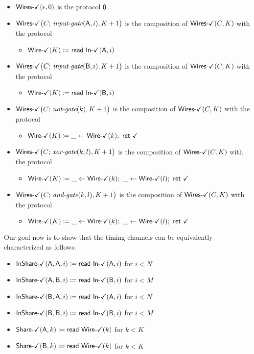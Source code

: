 \begin{itemize}
\item $\WiresOk(\epsilon,0)$ is the protocol $\zero$
\item $\WiresOk\big(C; \, \inputgate(\A,i),K+1\big)$ is the composition of $\WiresOk(C,K)$ with the protocol
\begin{itemize}
\item {\color{teal} $\WireOk(K) \coloneqq \read{\InOk(\A,i)}$}
\end{itemize}
\item $\WiresOk\big(C; \, \inputgate(\B,i),K+1\big)$ is the composition of $\WiresOk(C,K)$ with the protocol
\begin{itemize}
\item {\color{teal} $\WireOk(K) \coloneqq \read{\InOk(\B,i)}$}
\end{itemize}
\item $\WiresOk\big(C; \, \notgate(k),K+1\big)$ is the composition of $\WiresOk(C,K)$ with the protocol
\begin{itemize}
\item {\color{teal} $\WireOk(K) \coloneqq \_ \leftarrow \WireOk(k); \ \ret{\checkmark}$}
\end{itemize}
\item $\WiresOk\big(C; \, \xorgate(k,l),K+1\big)$ is the composition of $\WiresOk(C,K)$ with the protocol
\begin{itemize}
\item {\color{teal} $\WireOk(K) \coloneqq \_ \leftarrow \WireOk(k); \ \_ \leftarrow \WireOk(l); \ \ret{\checkmark}$}
\end{itemize}
\item $\WiresOk\big(C; \, \andgate(k,l),K+1\big)$ is the composition of $\WiresOk(C,K)$ with the protocol
\begin{itemize}
\item {\color{teal} $\WireOk(K) \coloneqq \_ \leftarrow \WireOk(k); \ \_ \leftarrow \WireOk(l); \ \ret{\checkmark}$}
\end{itemize}
\end{itemize}

\noindent Our goal now is to show that the timing channels can be equivalently characterized as follows:
\begin{itemize}
\item {\color{teal} $\InShareOk(\A,\A,i) \coloneqq \read{\InOk(\A,i)}$ for $i < N$}
\item {\color{teal} $\InShareOk(\A,\B,i) \coloneqq \read{\InOk(\B,i)}$ for $i < M$}
\item {\color{teal} $\InShareOk(\B,\A,i) \coloneqq \read{\InOk(\A,i)}$ for $i < N$}
\item {\color{teal} $\InShareOk(\B,\B,i) \coloneqq \read{\InOk(\B,i)}$ for $i < M$}
\item {\color{teal} $\ShareOk(\A,k) \coloneqq \read{\WireOk(k)}$ for $k < K$}
\item {\color{teal} $\ShareOk(\B,k) \coloneqq \read{\WireOk(k)}$ for $k < K$}
\end{itemize}

